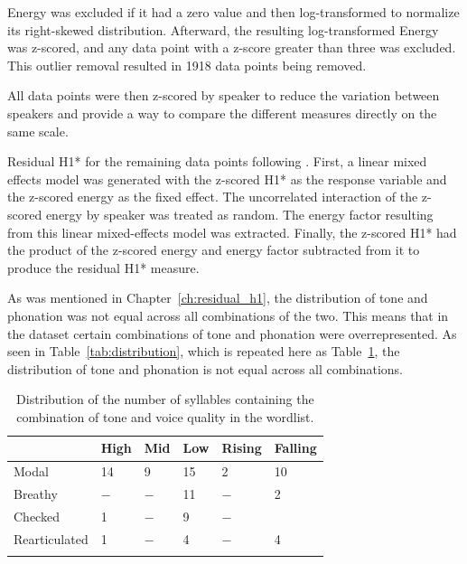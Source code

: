 Energy was excluded if it had a zero value and then log-transformed to normalize its right-skewed distribution. Afterward, the resulting log-transformed Energy was z-scored, and any data point with a z-score greater than three was excluded. This outlier removal resulted in 1918 data points being removed. 

All data points were then z-scored by speaker to reduce the variation between speakers and provide a way to compare the different measures directly on the same scale.

Residual H1* for the remaining data points following \citet{chaiH1H2AcousticMeasure2022}. First, a linear mixed effects model was generated with the z-scored H1* as the response variable and the z-scored energy as the fixed effect. The uncorrelated interaction of the z-scored energy by speaker was treated as random. The energy factor resulting from this linear mixed-effects model was extracted. Finally, the z-scored H1* had the product of the z-scored energy and energy factor subtracted from it to produce the residual H1* measure.

As was mentioned in Chapter~\ref{ch:residual_h1}, the distribution of tone and phonation was not equal across all combinations of the two. This means that in the dataset certain combinations of tone and phonation were overrepresented. As seen in Table~\ref{tab:distribution}, which is repeated here as Table~\ref{tab:distribution_repeat}, the distribution of tone and phonation is not equal across all combinations. 


\begin{table}[!h]
    \centering
    \caption{Distribution of the number of syllables containing the combination of tone and voice quality in the wordlist.}
    \label{tab:distribution_repeat}
      \begin{tabular}{llllll}
      \lsptoprule
      & High & Mid & Low & Rising & Falling\\
      \hline
      Modal & 14 & 9 & 15 & 2 & 10 \\
      Breathy & $-$ & $-$ & 11 & $-$ & 2 \\
      Checked & 1 & $-$ & 9 & $-$ & \\
      Rearticulated & 1 & $-$ & 4 & $-$ & 4 \\
      \lspbottomrule
      \end{tabular}
\end{table}

